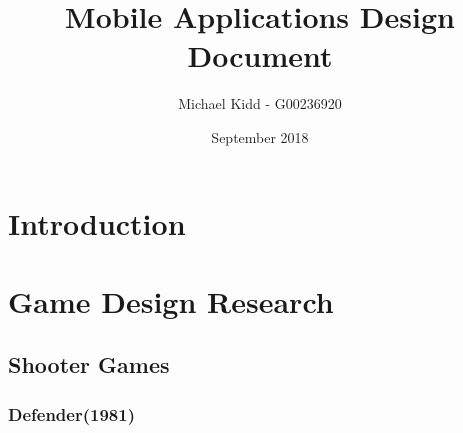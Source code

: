 \documentclass{article}
\title{Mobile Applications Design Document}
\author{Michael Kidd - G00236920}
\date{September 2018}
\begin{document}
 
\maketitle
\clearpage

\tableofcontents
\clearpage
 
\section{Introduction}

\clearpage
\section{Game Design Research}
\subsection{Shooter Games}
\subsubsection{Defender(1981)}
\end{document}
